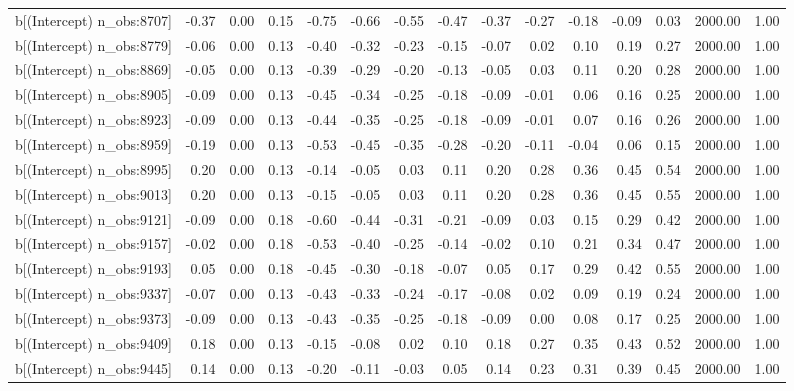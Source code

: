 \begin{table}[ht]
\begin{tabular}{rrrrrrrrrrrrrrr}
  b[(Intercept) n\_obs:8707] & -0.37 & 0.00 & 0.15 & -0.75 & -0.66 & -0.55 & -0.47 & -0.37 & -0.27 & -0.18 & -0.09 & 0.03 & 2000.00 & 1.00 \\ 
  b[(Intercept) n\_obs:8779] & -0.06 & 0.00 & 0.13 & -0.40 & -0.32 & -0.23 & -0.15 & -0.07 & 0.02 & 0.10 & 0.19 & 0.27 & 2000.00 & 1.00 \\ 
  b[(Intercept) n\_obs:8869] & -0.05 & 0.00 & 0.13 & -0.39 & -0.29 & -0.20 & -0.13 & -0.05 & 0.03 & 0.11 & 0.20 & 0.28 & 2000.00 & 1.00 \\ 
  b[(Intercept) n\_obs:8905] & -0.09 & 0.00 & 0.13 & -0.45 & -0.34 & -0.25 & -0.18 & -0.09 & -0.01 & 0.06 & 0.16 & 0.25 & 2000.00 & 1.00 \\ 
  b[(Intercept) n\_obs:8923] & -0.09 & 0.00 & 0.13 & -0.44 & -0.35 & -0.25 & -0.18 & -0.09 & -0.01 & 0.07 & 0.16 & 0.26 & 2000.00 & 1.00 \\ 
  b[(Intercept) n\_obs:8959] & -0.19 & 0.00 & 0.13 & -0.53 & -0.45 & -0.35 & -0.28 & -0.20 & -0.11 & -0.04 & 0.06 & 0.15 & 2000.00 & 1.00 \\ 
  b[(Intercept) n\_obs:8995] & 0.20 & 0.00 & 0.13 & -0.14 & -0.05 & 0.03 & 0.11 & 0.20 & 0.28 & 0.36 & 0.45 & 0.54 & 2000.00 & 1.00 \\ 
  b[(Intercept) n\_obs:9013] & 0.20 & 0.00 & 0.13 & -0.15 & -0.05 & 0.03 & 0.11 & 0.20 & 0.28 & 0.36 & 0.45 & 0.55 & 2000.00 & 1.00 \\ 
  b[(Intercept) n\_obs:9121] & -0.09 & 0.00 & 0.18 & -0.60 & -0.44 & -0.31 & -0.21 & -0.09 & 0.03 & 0.15 & 0.29 & 0.42 & 2000.00 & 1.00 \\ 
  b[(Intercept) n\_obs:9157] & -0.02 & 0.00 & 0.18 & -0.53 & -0.40 & -0.25 & -0.14 & -0.02 & 0.10 & 0.21 & 0.34 & 0.47 & 2000.00 & 1.00 \\ 
  b[(Intercept) n\_obs:9193] & 0.05 & 0.00 & 0.18 & -0.45 & -0.30 & -0.18 & -0.07 & 0.05 & 0.17 & 0.29 & 0.42 & 0.55 & 2000.00 & 1.00 \\ 
  b[(Intercept) n\_obs:9337] & -0.07 & 0.00 & 0.13 & -0.43 & -0.33 & -0.24 & -0.17 & -0.08 & 0.02 & 0.09 & 0.19 & 0.24 & 2000.00 & 1.00 \\ 
  b[(Intercept) n\_obs:9373] & -0.09 & 0.00 & 0.13 & -0.43 & -0.35 & -0.25 & -0.18 & -0.09 & 0.00 & 0.08 & 0.17 & 0.25 & 2000.00 & 1.00 \\ 
  b[(Intercept) n\_obs:9409] & 0.18 & 0.00 & 0.13 & -0.15 & -0.08 & 0.02 & 0.10 & 0.18 & 0.27 & 0.35 & 0.43 & 0.52 & 2000.00 & 1.00 \\ 
  b[(Intercept) n\_obs:9445] & 0.14 & 0.00 & 0.13 & -0.20 & -0.11 & -0.03 & 0.05 & 0.14 & 0.23 & 0.31 & 0.39 & 0.45 & 2000.00 & 1.00 \\ 

\end{tabular}
\end{table}
